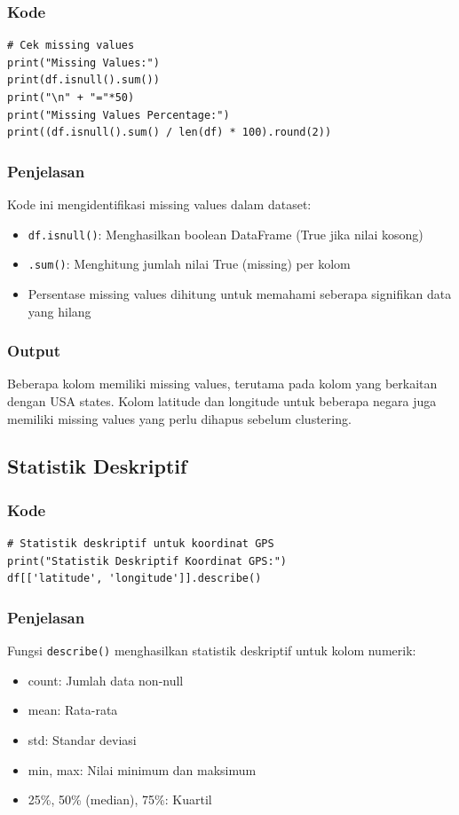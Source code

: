 \documentclass[12pt,a4paper]{article}
\begin{document}
\subsubsection{Kode}
\begin{lstlisting}[style=pythonstyle]
# Cek missing values
print("Missing Values:")
print(df.isnull().sum())
print("\n" + "="*50)
print("Missing Values Percentage:")
print((df.isnull().sum() / len(df) * 100).round(2))
\end{lstlisting}

\subsubsection{Penjelasan}
Kode ini mengidentifikasi missing values dalam dataset:
\begin{itemize}
    \item \texttt{df.isnull()}: Menghasilkan boolean DataFrame (True jika nilai kosong)
    \item \texttt{.sum()}: Menghitung jumlah nilai True (missing) per kolom
    \item Persentase missing values dihitung untuk memahami seberapa signifikan data yang hilang
\end{itemize}

\subsubsection{Output}
Beberapa kolom memiliki missing values, terutama pada kolom yang berkaitan dengan USA states. Kolom latitude dan longitude untuk beberapa negara juga memiliki missing values yang perlu dihapus sebelum clustering.

\subsection{Statistik Deskriptif}

\subsubsection{Kode}
\begin{lstlisting}[style=pythonstyle]
# Statistik deskriptif untuk koordinat GPS
print("Statistik Deskriptif Koordinat GPS:")
df[['latitude', 'longitude']].describe()
\end{lstlisting}

\subsubsection{Penjelasan}
Fungsi \texttt{describe()} menghasilkan statistik deskriptif untuk kolom numerik:
\begin{itemize}
    \item count: Jumlah data non-null
    \item mean: Rata-rata
    \item std: Standar deviasi
    \item min, max: Nilai minimum dan maksimum
    \item 25\%, 50\% (median), 75\%: Kuartil
\end{itemize}
\end{document}

